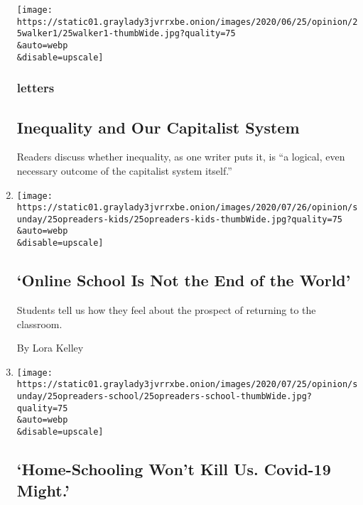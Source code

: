 \begin{enumerate}
  \texttt{[image: https://static01.graylady3jvrrxbe.onion/images/2020/06/25/opinion/25walker1/25walker1-thumbWide.jpg?quality=75\\\&auto=webp\\\&disable=upscale]}

  \hypertarget{letters}{%
  \subsubsection{letters}\label{letters}}

  \hypertarget{inequality-and-our-capitalist-system}{%
  \subsection{Inequality and Our Capitalist
  System}\label{inequality-and-our-capitalist-system}}

  Readers discuss whether inequality, as one writer puts it, is ``a
  logical, even necessary outcome of the capitalist system itself.''
\item
  \href{/2020/07/25/opinion/sunday/coronavirus-kids-school.html}{}

  \texttt{[image: https://static01.graylady3jvrrxbe.onion/images/2020/07/26/opinion/sunday/25opreaders-kids/25opreaders-kids-thumbWide.jpg?quality=75\\\&auto=webp\\\&disable=upscale]}

  \hypertarget{online-school-is-not-the-end-of-the-world}{%
  \subsection{`Online School Is Not the End of the
  World'}\label{online-school-is-not-the-end-of-the-world}}

  Students tell us how they feel about the prospect of returning to the
  classroom.

  By Lora Kelley
\item
  \href{/2020/07/25/opinion/coronavirus-school-reopening.html}{}

  \texttt{[image: https://static01.graylady3jvrrxbe.onion/images/2020/07/25/opinion/sunday/25opreaders-school/25opreaders-school-thumbWide.jpg?quality=75\\\&auto=webp\\\&disable=upscale]}

  \hypertarget{home-schooling-wont-kill-us-covid-19-might-1}{%
  \subsection{`Home-Schooling Won't Kill Us. Covid-19
  Might.'}\label{home-schooling-wont-kill-us-covid-19-might-1}}


\end{enumerate}
